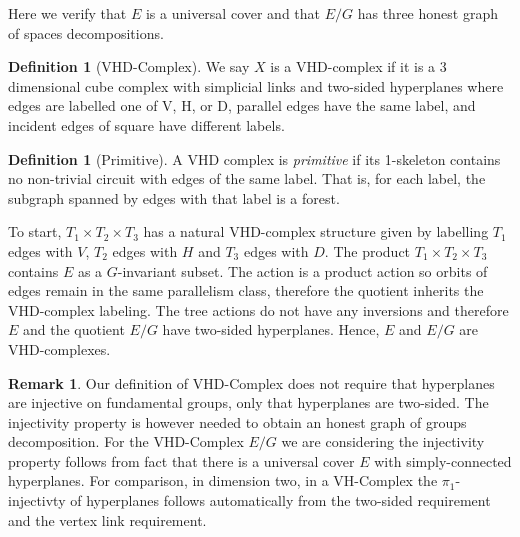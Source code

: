 \documentclass[12pt,parskip=full]{report}
\theoremstyle{plain}
\theoremstyle{definition}
\newtheorem{rmk}[thm]{Remark}
\newtheorem{dfn}[thm]{Definition}
\begin{document}
Here we verify that \(E\) is a universal cover and that \(E/G\) has three honest graph of spaces decompositions.

\begin{dfn}
    [VHD-Complex]
    \label{dfn:vhd}
    We say \(X\) is a VHD-complex if it is a 3 dimensional cube complex with simplicial links and two-sided hyperplanes where edges are labelled one of V, H, or D, parallel edges have the same label, and incident edges of square have different labels.
\end{dfn}

\begin{dfn}
    [Primitive]
    \label{dfn:primitive}
    A VHD complex is \emph{primitive} if its 1-skeleton contains no non-trivial circuit with edges of the same label. That is, for each label, the subgraph spanned by edges with that label is a forest.
\end{dfn}

To start, \(T_1\times T_2\times T_3\) has a natural VHD-complex structure given by labelling \(T_1\) edges with \(V\), \(T_2\) edges with \(H\) and \(T_3\) edges with \(D\). The product \(T_1\times T_2\times T_3\) contains \(E\) as a \(G\)-invariant subset. The action is a product action so orbits of edges remain in the same parallelism class, therefore the quotient inherits the VHD-complex labeling. The tree actions do not have any inversions and therefore \(E\) and the quotient \(E/G\) have two-sided hyperplanes. Hence, \(E\) and \(E/G\) are VHD-complexes.


\begin{rmk}
    Our definition of VHD-Complex does not require that hyperplanes are injective on fundamental groups, only that hyperplanes are two-sided. The injectivity property is  however needed to obtain an honest graph of groups decomposition. For the VHD-Complex \(E/G\) we are considering the injectivity property follows from fact that there is a universal cover \(E\) with simply-connected hyperplanes. For comparison, in dimension two, in a VH-Complex the \(\pi_1\)-injectivty of hyperplanes follows automatically from the two-sided requirement and the vertex link requirement.
\end{rmk}
\end{document}
